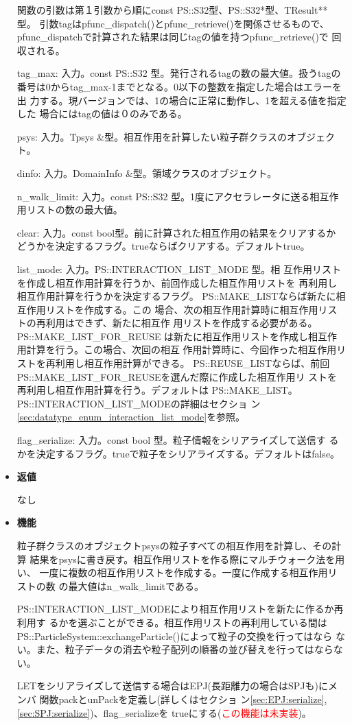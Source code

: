 \begin{itemize}
関数の引数は第１引数から順にconst PS::S32型、PS::S32*型、TResult**型。
引数tagはpfunc\_dispatch()とpfunc\_retrieve()を関係させるもので、
pfunc\_dispatchで計算された結果は同じtagの値を持つpfunc\_retrieve()で
回収される。

tag\_max: 入力。const PS::S32 型。発行されるtagの数の最大値。扱うtagの
番号は0からtag\_max-1までとなる。0以下の整数を指定した場合はエラーを出
力する。現バージョンでは、1の場合に正常に動作し、1を超える値を指定した
場合にはtagの値は０のみである。

psys: 入力。Tpsys \&型。相互作用を計算したい粒子群クラスのオブジェクト。

dinfo: 入力。DomainInfo \&型。領域クラスのオブジェクト。

n\_walk\_limit: 入力。const PS::S32 型。1度にアクセラレータに送る相互作用リストの数の最大値。

clear: 入力。const bool型。前に計算された相互作用の結果をクリアするか
どうかを決定するフラグ。trueならばクリアする。デフォルトtrue。

list\_mode: 入力。PS::INTERACTION\_LIST\_MODE 型。相
互作用リストを作成し相互作用計算を行うか、前回作成した相互作用リストを
再利用し相互作用計算を行うかを決定するフラグ。
PS::MAKE\_LISTならば新たに相互作用リストを作成する。この
場合、次の相互作用計算時に相互作用リストの再利用はできず、新たに相互作
用リストを作成する必要がある。PS::MAKE\_LIST\_FOR\_REUSE
は新たに相互作用リストを作成し相互作用計算を行う。この場合、次回の相互
作用計算時に、今回作った相互作用リストを再利用し相互作用計算ができる。
PS::REUSE\_LISTならば、前回
PS::MAKE\_LIST\_FOR\_REUSEを選んだ際に作成した相互作用リ
ストを再利用し相互作用計算を行う。デフォルトは
PS::MAKE\_LIST。PS::INTERACTION\_LIST\_MODEの詳細はセクショ
ン\ref{sec:datatype_enum_interaction_list_mode}を参照。

flag\_serialize: 入力。const bool 型。粒子情報をシリアライズして送信す
るかを決定するフラグ。trueで粒子をシリアライズする。デフォルトはfalse。

\item {\bf 返値}

なし

\item {\bf 機能}

粒子群クラスのオブジェクトpsysの粒子すべての相互作用を計算し、その計算
結果をpsysに書き戻す。相互作用リストを作る際にマルチウォーク法を用い、
一度に複数の相互作用リストを作成する。一度に作成する相互作用リストの数
の最大値はn\_walk\_limitである。

PS::INTERACTION\_LIST\_MODEにより相互作用リストを新たに作るか再利用す
るかを選ぶことができる。相互作用リストの再利用している間は
PS::ParticleSystem::exchangeParticle()によって粒子の交換を行ってはなら
ない。また、粒子データの消去や粒子配列の順番の並び替えを行ってはならな
い。

LETをシリアライズして送信する場合はEPJ(長距離力の場合はSPJも)にメンバ
関数packとunPackを定義し(詳しくはセクショ
ン\ref{sec:EPJ:serialize},\ref{sec:SPJ:serialize})、flag\_serializeを
trueにする(\textcolor{red}{この機能は未実装})。

\end{itemize}

